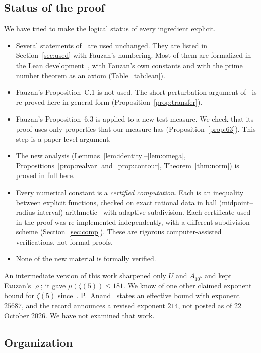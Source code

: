 \documentclass[11pt]{article}
\theoremstyle{remark}
\newcommand{\Ubar}{\overline{U}}
\begin{document}
\subsection{Status of the proof}\label{sec:status}

We have tried to make the logical status of every ingredient explicit.
\begin{itemize}
\item Several statements of~\cite{F} are used unchanged. They are listed in Section~\ref{sec:used} with Fauzan's numbering. Most of them are formalized in the Lean development~\cite{DR}, with Fauzan's own constants and with the prime number theorem as an axiom (Table~\ref{tab:lean}).
\item Fauzan's Proposition~C.1 is not used. The short perturbation argument of~\cite[App.~C.2]{F} is re-proved here in general form (Proposition~\ref{prop:transfer}).
\item Fauzan's Proposition~6.3 is applied to a new test measure. We check that its proof uses only properties that our measure has (Proposition~\ref{prop:63}). This step is a paper-level argument.
\item The new analysis (Lemmas~\ref{lem:identity}--\ref{lem:omega}, Propositions~\ref{prop:realvar} and~\ref{prop:contour}, Theorem~\ref{thm:norm}) is proved in full here.
\item Every numerical constant is a \emph{certified computation}. Each is an inequality between explicit functions, checked on exact rational data in ball (midpoint--radius interval) arithmetic~\cite{Jo,flint} with adaptive subdivision. Each certificate used in the proof was re-implemented independently, with a different subdivision scheme (Section~\ref{sec:comp}). These are rigorous computer-assisted verifications, not formal proofs.
\item None of the new material is formally verified.
\end{itemize}
An intermediate version of this work sharpened only $\Ubar$ and $A_{10^5}$ and kept Fauzan's $\varrho$; it gave $\mu(\zeta(5))\le181$. We know of one other claimed exponent bound for $\zeta(5)$ since~\cite{F}. P.~Anand~\cite{An} states an effective bound with exponent $25687$, and the record announces a revised exponent $214$, not posted as of 22 October 2026. We have not examined that work.

\subsection{Organization}
\end{document}

